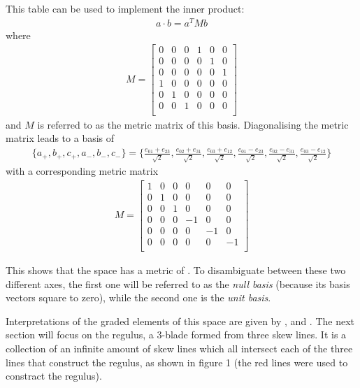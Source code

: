 \documentclass[a4paper, 10pt]{article}
\begin{document}
This table can be used to implement the inner product:
\begin{align*}
  a \cdot b = a^T M b 
\end{align*}
where
\begin{align*}
  M =
  \begin{bmatrix}
    0 & 0 & 0 & 1 & 0 & 0 \\
    0 & 0 & 0 & 0 & 1 & 0 \\
    0 & 0 & 0 & 0 & 0 & 1 \\
    1 & 0 & 0 & 0 & 0 & 0 \\
    0 & 1 & 0 & 0 & 0 & 0 \\
    0 & 0 & 1 & 0 & 0 & 0 \\
  \end{bmatrix}
\end{align*}
and $M$ is referred to as the metric matrix of this basis. Diagonalising the
metric matrix leads to a basis of
\begin{align*}
  \lbrace a_+, b_+, c_+, a_-, b_-, c_- \rbrace =
  \lbrace \frac{ e_{01} + e_{23} }{\sqrt{2}}, \frac{ e_{02} + e_{31} }{\sqrt{2}}, \frac{ e_{03} + e_{12} }{\sqrt{2}}, 
  \frac{ e_{01} - e_{23} }{\sqrt{2}}, \frac{ e_{02} - e_{31} }{\sqrt{2}}, \frac{
    e_{03} - e_{12} }{\sqrt{2}} \rbrace
\end{align*}
with a corresponding metric matrix
\begin{align*}
  M =
  \begin{bmatrix}
    1 & 0 & 0 & 0 & 0 & 0 \\
    0 & 1 & 0 & 0 & 0 & 0 \\
    0 & 0 & 1 & 0 & 0 & 0 \\
    0 & 0 & 0 & -1 & 0 & 0 \\
    0 & 0 & 0 & 0 & -1 & 0 \\
    0 & 0 & 0 & 0 & 0 & -1 \\
  \end{bmatrix}
\end{align*}

This shows that the space has a metric of \rp.
To disambiguate between these two different axes, the first one will be referred
to as the \emph{null basis} (because its basis vectors square to zero), while the
second one is the \emph{unit basis}.

Interpretations of the graded elements of this space are given by
\cite{dekok2012}, \cite{hangbo2011} and \cite{dorst2013versors}. The next
section will focus on the regulus, a 3-blade formed from three skew lines. It is
a collection of an infinite amount of skew lines which all intersect each of the
three lines that construct the regulus, as shown in figure 1 (the red lines were
used to constract the regulus).
\end{document}
